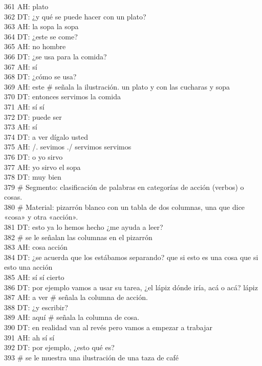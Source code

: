 361 AH: plato\\
362 DT: ¿y qué se puede hacer con un plato?\\
363 AH: la sopa la sopa\\
364 DT: ¿este se come?\\
365 AH: no hombre\\
366 DT: ¿se usa para la comida?\\
367 AH: sí\\
368 DT: ¿cómo se usa?\\
369 AH: este # señala la ilustración. un plato y con las cucharas y sopa\\
370 DT: entonces servimos la comida\\
371 AH: sí sí\\
372 DT: puede ser\\
373 AH: sí\\
374 DT: a ver dígalo usted\\
375 AH: /. sevimos ./ servimos servimos\\
376 DT: o yo sirvo\\
377 AH: yo sirvo el sopa\\
378 DT: muy bien\\
379 # Segmento: clasificación de palabras en categorías de acción (verbos) o cosas.\\
380 # Material: pizarrón blanco con un tabla de dos columnas, una  que dice «cosa» y otra «acción».\\
381 DT: esto ya lo hemos hecho ¿me ayuda a leer?\\
382 # se le señalan las columnas en el pizarrón\\
383 AH: cosa acción\\
384 DT: ¿se acuerda que los estábamos separando? que si esto es una cosa que si esto una acción\\
385 AH: sí sí cierto\\
386 DT: por ejemplo vamos a usar su tarea, ¿el lápiz dónde iría, acá o acá? lápiz\\
387 AH: a ver # señala la columna de acción.\\
388 DT: ¿y escribir?\\
389 AH: aquí # señala la columna de cosa.\\
390 DT: en realidad van al revés pero vamos a empezar a trabajar\\
391 AH: ah sí sí\\
392 DT: por ejemplo, ¿esto qué es?\\
393 # se le muestra una ilustración de una taza de café\\
